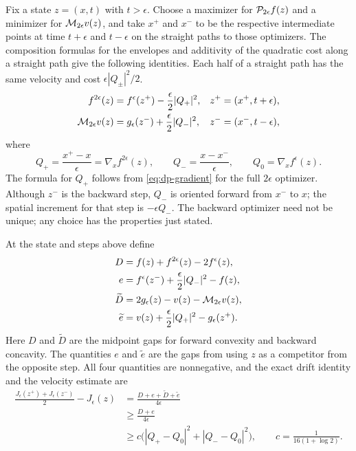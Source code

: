 Fix a state $z=(x,t)$ with $t>\epsilon$.  Choose a maximizer for
$\mathcal{P}_{2\epsilon}f(z)$ and a minimizer for $\mathcal{M}_{2\epsilon}v(z)$, and
take $x^+$ and $x^-$ to be the respective intermediate points at time
$t+\epsilon$ and $t-\epsilon$ on the straight paths to those optimizers.
The composition formulas for the envelopes and additivity of the quadratic
cost along a straight path give the following identities.  Each half of a
straight path has the same velocity and cost $\epsilon|Q_\pm|^2/2$.
\begin{equation}\label{eq:dp-step-choice}
\begin{aligned}
  f^{2\epsilon}(z)&=f^\epsilon(z^+)-\frac{\epsilon}{2}|Q_+|^2,
       &z^+&=(x^+,t+\epsilon),\\
  \mathcal{M}_{2\epsilon}v(z)&=g_\epsilon(z^-)+\frac{\epsilon}{2}|Q_-|^2,
       &z^-&=(x^-,t-\epsilon),
\end{aligned}
\end{equation}
where
\begin{equation}\label{eq:dp-velocities}
  Q_+=\frac{x^+-x}{\epsilon}=\nabla_x f^{2\epsilon}(z),\qquad
  Q_-=\frac{x-x^-}{\epsilon},\qquad Q_0=\nabla_x f^\epsilon(z).
\end{equation}
The formula for $Q_+$ follows from \eqref{eq:dp-gradient} for the full
$2\epsilon$ optimizer.  Although $z^-$ is the backward step, $Q_-$ is
oriented forward from $x^-$ to $x$; the spatial increment for that step is
$-\epsilon Q_-$.  The backward optimizer need not be unique; any choice has
the properties just stated.

\begin{lemma}\label{lem:dp-drift}
At the state and steps above define
\begin{align*}
  D&=f(z)+f^{2\epsilon}(z)-2f^\epsilon(z),\\
  e&=f^\epsilon(z^-)+\frac{\epsilon}{2}|Q_-|^2-f(z),\\
  \widetilde D&=2g_\epsilon(z)-v(z)-\mathcal{M}_{2\epsilon}v(z),\\
  \widetilde e&=v(z)+\frac{\epsilon}{2}|Q_+|^2-g_\epsilon(z^+).
\end{align*}
Here $D$ and $\widetilde D$ are the midpoint gaps for forward convexity and
backward concavity.  The quantities $e$ and $\widetilde e$ are the gaps from
using $z$ as a competitor from the opposite step.
All four quantities are nonnegative, and the exact drift identity and the
velocity estimate are
\begin{equation}\label{eq:dp-drift}
\begin{split}
  \frac{J_\epsilon(z^+)+J_\epsilon(z^-)}{2}-J_\epsilon(z)
  &=\frac{D+e+\widetilde D+\widetilde e}{4\epsilon}\\
  &\ge\frac{D+e}{4\epsilon}\\
  &\ge c\bigl(|Q_+-Q_0|^2+|Q_--Q_0|^2\bigr),
  \qquad c=\frac{1}{16(1+\log2)}.
\end{split}
\end{equation}
\end{lemma}

